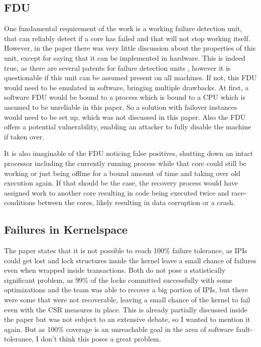 \documentclass[a4paper,10pt,twoside]{article}
\begin{document}
\subsection{FDU} \label{fdu}
One fundamental requirement of the work is a working failure detection unit, that can reliably detect if a core has failed and that will not stop working itself. However, in the paper there was very little discussion about the properties of this unit, except for saying that it can be implemented in hardware. This is indeed true, as there are several patents for failure detection units \cite{IBMFDU} \cite{FujitsuFDU}, however it is questionable if this unit can be assumed present on all machines. If not, this FDU would need to be emulated in software, bringing multiple drawbacks. At first, a software FDU would be bound to a process which is bound to a CPU which is assumed to be unreliable in this paper. So a solution with failover instances would need to be set up, which was not discussed in this paper. Also the FDU offers a potential vulnerability, enabling an attacker to fully disable the machine if taken over.

It is also imaginable of the FDU noticing false positives, shutting down an intact processor including the currently running process while that core could still be working or just being offline for a bound amount of time and taking over old execution again. If that should be the case, the recovery process would have assigned work to another core resulting in code being executed twice and race-conditions between the cores, likely resulting in data corruption or a crash.

\subsection{Failures in Kernelspace}
The paper states that it is not possible to reach 100\% failure tolerance, as IPIs could get lost and lock structures inside the kernel leave a small chance of failures even when wrapped inside transactions. Both do not pose a statistically significant problem, as 99\% of the locks committed successfully with some optimizations and the team was able to recover a big portion of IPIs, but there were some that were not recoverable, leaving a small chance of the kernel to fail even with the CSR measures in place. This is already partially discussed inside the paper but was not subject to an extensive debate, so I wanted to mention it again. But as 100\% coverage is an unreachable goal in the area of software fault-tolerance, I don't think this poses a great problem.
\end{document}
